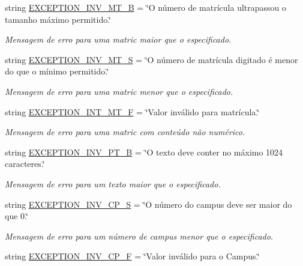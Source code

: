\begin{DoxyCompactItemize}
string \hyperlink{namespaceELO_1_1lang_1_1pt__br_a29e0f9e093008c2fe9f36ed60b0782ce}{E\-X\-C\-E\-P\-T\-I\-O\-N\-\_\-\-I\-N\-V\-\_\-\-M\-T\-\_\-\-B} = \char`\"{}O número de matrícula ultrapassou o tamanho máximo permitido.\char`\"{}
\begin{DoxyCompactList}\small\item\em Mensagem de erro para uma matric maior que o especificado. \end{DoxyCompactList}\item 
string \hyperlink{namespaceELO_1_1lang_1_1pt__br_a352f2d27b1164858953aa20ef9bf0989}{E\-X\-C\-E\-P\-T\-I\-O\-N\-\_\-\-I\-N\-V\-\_\-\-M\-T\-\_\-\-S} = \char`\"{}O número de matrícula digitado é menor do que o mínimo permitido.\char`\"{}
\begin{DoxyCompactList}\small\item\em Mensagem de erro para uma matric menor que o especificado. \end{DoxyCompactList}\item 
string \hyperlink{namespaceELO_1_1lang_1_1pt__br_a1b63b665c3b42f0f393a5c41e40dc888}{E\-X\-C\-E\-P\-T\-I\-O\-N\-\_\-\-I\-N\-T\-\_\-\-M\-T\-\_\-\-F} = \char`\"{}Valor inválido para matrícula.\char`\"{}
\begin{DoxyCompactList}\small\item\em Mensagem de erro para uma matric com conteúdo não numérico. \end{DoxyCompactList}\item 
string \hyperlink{namespaceELO_1_1lang_1_1pt__br_a8be4b8c08c31de303a7e16ccc9c012b9}{E\-X\-C\-E\-P\-T\-I\-O\-N\-\_\-\-I\-N\-V\-\_\-\-P\-T\-\_\-\-B} = \char`\"{}O texto deve conter no máximo 1024 caracteres.\char`\"{}
\begin{DoxyCompactList}\small\item\em Mensagem de erro para um texto maior que o especificado. \end{DoxyCompactList}\item 
string \hyperlink{namespaceELO_1_1lang_1_1pt__br_a4ddcdc425d146648a599ef3a51370add}{E\-X\-C\-E\-P\-T\-I\-O\-N\-\_\-\-I\-N\-V\-\_\-\-C\-P\-\_\-\-S} = \char`\"{}O número do campus deve ser maior do que 0.\char`\"{}
\begin{DoxyCompactList}\small\item\em Mensagem de erro para um número de campus menor que o especificado. \end{DoxyCompactList}\item 
string \hyperlink{namespaceELO_1_1lang_1_1pt__br_a7819a19b8f01bae3ab0769603a6271a6}{E\-X\-C\-E\-P\-T\-I\-O\-N\-\_\-\-I\-N\-V\-\_\-\-C\-P\-\_\-\-F} = \char`\"{}Valor inválido para o Campus.\char`\"{}

\end{DoxyCompactItemize}
